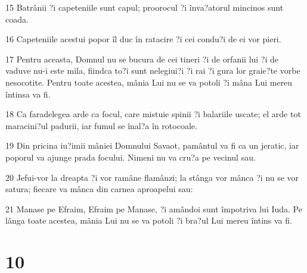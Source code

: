 \par 15 Batrânii ?i capeteniile sunt capul; proorocul ?i înva?atorul mincinos sunt coada.
\par 16 Capeteniile acestui popor îl duc în ratacire ?i cei condu?i de ei vor pieri.
\par 17 Pentru aceasta, Domnul nu se bucura de cei tineri ?i de orfanii lui ?i de vaduve nu-i este mila, fiindca to?i sunt nelegiui?i ?i rai ?i gura lor graie?te vorbe nesocotite. Pentru toate acestea, mânia Lui nu se va potoli ?i mâna Lui mereu întinsa va fi.
\par 18 Ca faradelegea arde ca focul, care mistuie spinii ?i balariile uscate; el arde tot maracini?ul padurii, iar fumul se înal?a în rotocoale.
\par 19 Din pricina iu?imii mâniei Domnului Savaot, pamântul va fi ca un jeratic, iar poporul va ajunge prada focului. Nimeni nu va cru?a pe vecinul sau.
\par 20 Jefui-vor la dreapta ?i vor ramâne flamânzi; la stânga vor mânca ?i nu se vor satura; fiecare va mânca din carnea aproapelui sau:
\par 21 Manase pe Efraim, Efraim pe Manase, ?i amândoi sunt împotriva lui Iuda. Pe lânga toate acestea, mânia Lui nu se va potoli ?i bra?ul Lui mereu întins va fi.

\chapter{10}

